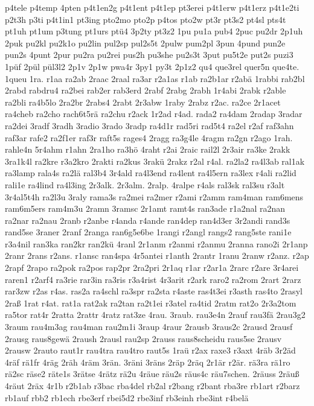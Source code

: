 {p4tele
p4temp
4pten
p4t1en2g
p4t1ent
p4t1ep
pt3erei
p4t1erw
p4t1erz
p4t1e2ti
p2t3h
p3ti
p4t1in1
pt3ing
pto2mo
pto2p
p4tos
pto2w
pt3r
pt3s2
pt4sl
pts4t
pt1uh
pt1um
p3tung
pt1urs
ptü4
3p2ty
pt3z2
1pu
pu1a
pub4
2puc
pu2dr
2p1uh
2puk
pu2kl
pu2k1o
pu2lin
pul2sp
pul2s5t
2pulw
pum2pl
3pun
4pund
pun2e
pun2s
4punt
2pur
pu2ra
pu2rei
pus2h
pu3she
pu2s3t
3put
pu5t2e
put2s
puzi3
1püf
2pül
pül3l2
2p1v
2p1w
pwa4r
3py1
py3t
2p1z2
qu4
que3rel
quer5n
que4te.
1queu
1ra.
r1aa
ra2ab
2raac
2raal
ra3ar
r2a1as
r1ab
ra2b1ar
r2abä
1rabbi
rab2bl
2rabd
rabdru4
ra2bei
rab2er
rab3erd
2rabf
2rabg
2rabh
1r4abi
2rabk
r2able
ra2bli
ra4b5lo
2ra2br
2rabs4
2rabt
2r3abw
1raby
2rabz
r2ac.
ra2ce
2r1acet
ra4cheb
ra2cho
rach6t5rä
ra2chu
r2ack
1r2ad
r4ad.
rada2
ra4dam
2radap
3radar
ra2dei
3radf
3radh
3radio
3rado
3radp
ra4d1r
rad5ri
rad5t4
ra2el
r2af
raf3ahn
raf3ar
rafe2
ra2f1er
raf3r
raft5s
rages4
2ragg
ra3g4le
4ragm
ra2gn
r2ago
1rah.
rahle4n
5r4ahm
r1ahn
2ra1ho
ra3hö
4raht
r2ai
2raic
rail2l
2r3air
ra3ke
2rakk
3ra1k4l
ra2kre
r3a2kro
2rakti
ra2kus
3rakü
2rakz
r2al
r4al.
ra2la2
ra4l3ab
ral1ak
ra3lamp
rala4s
ra2lä
ral3b4
3r4ald
ra4l3end
ra4lent
ra4l5ern
ra3lex
r4ali
ra2lid
rali1e
ra4lind
ra4l3ing
2r3alk.
2r3alm.
2ralp.
4ralpe
r4als
ral3sk
ral3su
r3alt
3r4al5t4h
ra2l3u
3raly
rama3s
ra2mei
ra2mer
r2ami
r2amm
ram4man
ram6mens
ram6m5ers
ram4m3u
2ramn
3ramsc
2r1amt
ramt4s
ran3ade
r1a2nal
ra2nan
ra2nar
ra2nau
2ranb
r2anbe
r4anda
r4ande
ran4dep
ran4d3er
3r2andi
rand3s
rand5se
3raner
2ranf
2ranga
ran6g5e6be
1rangi
r2angl
rangs2
rang5ste
rani1e
r3a4nil
ran3ka
ran2kr
ran2kü
4ranl
2r1anm
r2anmi
r2anmu
2ranna
rano2i
2r1anp
2ranr
2rans
r2ans.
r1ansc
ran4spa
4r5antei
r1anth
2rantr
1ranu
2ranw
r2anz.
r2ap
2rapf
2rapo
ra2pok
ra2pos
rap2pr
2ra2pri
2r1aq
r1ar
r2ar1a
2rarc
r2are
3r4arei
raren1
r2arf4
ra3rie
rar3in
ra3ris
r3a4rist
4r3arit
r2ark
raro2
ra2rom
2rart
2rarz
rar3zw
r2as
r4as.
ras2a
ra4schl
ra3spr
ra2sta
r4aste
ras4t3ei
r3asth
ras4to
2rasyl
2raß
1rat
r4at.
rat1a
rat2ak
ra2tan
ra2t1ei
r3atel
ra4tid
2ratm
rat2o
2r3a2tom
ra5tor
rat4r
2ratta
2rattr
4ratz
rat3ze
4rau.
3raub.
rau3e4n
2rauf
rau3fä
2rau3g2
3raum
rau4m3ag
rau4man
rau2m1i
3raup
4raur
2rausb
3raus2c
2rausd
2rausf
2rausg
raus8gewä
2raush
2rausl
rau2sp
2rauss
raus8scheidu
raus5se
2rausv
2rausw
2rauto
raut1r
rau4tra
rau4tro
raut5s
1raü
r2ax
raxe3
r3axt
4räb
3r2äd
4räf
rä1fr
4räg
2räh
4räm
3rän.
3räni
3räns
2räp
2räq
2r1är
r2är.
rä3ra
rä1ro
rä2sc
räse2
räte1s
3rätse
4rätz
rä2u
4räue
räu2s
räus4c
räu7schen.
2räuss
2räuß
4räut
2räx
4r1b
r2b1ab
r3bac
rba4del
rb2al
r2bang
r2bant
rba3re
rb1art
r2barz
rb1auf
rbb2
rb1ech
rbe3erf
rbei5d2
rbe3inf
rb3einh
rbe3int
r4belä
}
